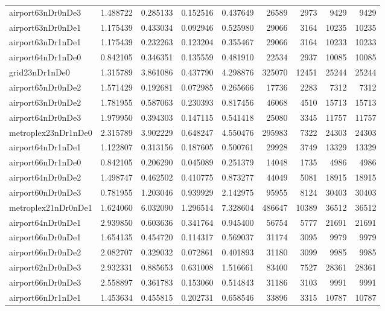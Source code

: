 \begin{longtable}{|l|r|r|r|r|r|r|r|r|}
airport63nDr0nDe3 & 1.488722 & 0.285133 & 0.152516 & 0.437649 & 26589 & 2973 & 9429 & 9429 \\
airport63nDr0nDe1 & 1.175439 & 0.433034 & 0.092946 & 0.525980 & 29066 & 3164 & 10235 & 10235 \\
airport63nDr1nDe1 & 1.175439 & 0.232263 & 0.123204 & 0.355467 & 29066 & 3164 & 10233 & 10233 \\
airport64nDr1nDe0 & 0.842105 & 0.346351 & 0.135559 & 0.481910 & 22534 & 2937 & 10085 & 10085 \\
grid23nDr1nDe0 & 1.315789 & 3.861086 & 0.437790 & 4.298876 & 325070 & 12451 & 25244 & 25244 \\
airport65nDr0nDe2 & 1.571429 & 0.192681 & 0.072985 & 0.265666 & 17736 & 2283 & 7312 & 7312 \\
airport63nDr0nDe2 & 1.781955 & 0.587063 & 0.230393 & 0.817456 & 46068 & 4510 & 15713 & 15713 \\
airport64nDr0nDe3 & 1.979950 & 0.394303 & 0.147115 & 0.541418 & 25080 & 3345 & 11757 & 11757 \\
metroplex23nDr1nDe0 & 2.315789 & 3.902229 & 0.648247 & 4.550476 & 295983 & 7322 & 24303 & 24303 \\
airport64nDr1nDe1 & 1.122807 & 0.313156 & 0.187605 & 0.500761 & 29928 & 3749 & 13329 & 13329 \\
airport66nDr1nDe0 & 0.842105 & 0.206290 & 0.045089 & 0.251379 & 14048 & 1735 & 4986 & 4986 \\
airport64nDr0nDe2 & 1.498747 & 0.462502 & 0.410775 & 0.873277 & 44049 & 5081 & 18915 & 18915 \\
airport60nDr0nDe3 & 0.781955 & 1.203046 & 0.939929 & 2.142975 & 95955 & 8124 & 30403 & 30403 \\
metroplex21nDr0nDe1 & 1.624060 & 6.032090 & 1.296514 & 7.328604 & 486647 & 10389 & 36512 & 36512 \\
airport64nDr0nDe1 & 2.939850 & 0.603636 & 0.341764 & 0.945400 & 56754 & 5777 & 21691 & 21691 \\
airport66nDr0nDe1 & 1.654135 & 0.454720 & 0.114317 & 0.569037 & 31174 & 3095 & 9979 & 9979 \\
airport66nDr0nDe2 & 2.082707 & 0.329032 & 0.072861 & 0.401893 & 31180 & 3099 & 9985 & 9985 \\
airport62nDr0nDe3 & 2.932331 & 0.885653 & 0.631008 & 1.516661 & 83400 & 7527 & 28361 & 28361 \\
airport66nDr0nDe3 & 2.558897 & 0.361783 & 0.153060 & 0.514843 & 31186 & 3103 & 9991 & 9991 \\
airport66nDr1nDe1 & 1.453634 & 0.455815 & 0.202731 & 0.658546 & 33896 & 3315 & 10787 & 10787 \\

\end{longtable}

